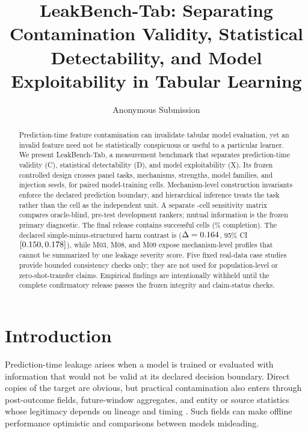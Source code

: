 \documentclass[letterpaper]{article}
\title{LeakBench-Tab: Separating Contamination Validity, Statistical Detectability, and Model Exploitability in Tabular Learning}
\author{Anonymous Submission}
\begin{document}
\maketitle

\ifLBResultsReady\else
\begin{center}
\end{center}
\fi

\begin{abstract}
Prediction-time feature contamination can invalidate tabular model evaluation,
yet an invalid feature need not be statistically conspicuous or useful to a
particular learner.  We present LeakBench-Tab, a measurement benchmark that
separates prediction-time validity (C), statistical detectability (D), and
model exploitability (X).  Its frozen controlled design crosses
\LBControlledTaskCount{} panel tasks, \LBMechanismCount{} mechanisms,
\LBStrengthCount{} strengths, \LBCoreModelCount{} model families, and
\LBSeedCount{} injection seeds, for \LBExpectedCells{} paired model-training
cells.  Mechanism-level construction invariants enforce the declared prediction
boundary, and hierarchical inference treats the task rather than the cell as
the independent unit.  A separate \LBExpectedDiagnosticCells{}-cell sensitivity
matrix compares \LBDiagnosticMethodCount{} oracle-blind, pre-test development
rankers; mutual information is the frozen primary diagnostic.
\ifLBResultsReady
The final release contains \LBSuccessfulCells{} successful cells
(\LBCompletionRate\% completion).  The declared simple-minus-structured
harm contrast is \LBSimpleStructuredStatus{} ($\Delta=
0.164$, 95\% CI
$[0.150,0.178]$), while M03, M08, and
M09 expose mechanism-level profiles that cannot be summarized by one leakage
severity score.  Five fixed real-data case studies provide bounded consistency
checks only; they are not used for population-level or
zero-shot-transfer claims.
\else
Empirical findings are intentionally withheld until the complete confirmatory
release passes the frozen integrity and claim-status checks.
\fi
\end{abstract}

\section{Introduction}
Prediction-time leakage arises when a model is trained or evaluated with
information that would not be valid at its declared decision boundary.  Direct
copies of the target are obvious, but practical contamination also enters
through post-outcome fields, future-window aggregates, and entity or source
statistics whose legitimacy depends on lineage and timing
\citep{kaufman2011leakage,kapoor2023leakage,davis2024framework}.  Such fields can
make offline performance optimistic and comparisons between models misleading.
\end{document}
